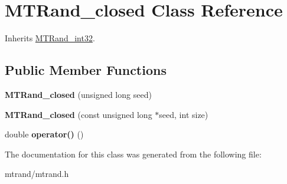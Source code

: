 \hypertarget{class_m_t_rand__closed}{
\section{\-M\-T\-Rand\-\_\-closed \-Class \-Reference}
\label{class_m_t_rand__closed}
}


\-Inherits \hyperlink{class_m_t_rand__int32}{\-M\-T\-Rand\-\_\-int32}.

\subsection*{\-Public \-Member \-Functions}
\begin{DoxyCompactItemize}
\item 
\hypertarget{class_m_t_rand__closed_ad5dc83250b16f22d4693a18b51816271}{
{\bfseries \-M\-T\-Rand\-\_\-closed} (unsigned long seed)}
\label{class_m_t_rand__closed_ad5dc83250b16f22d4693a18b51816271}

\item 
\hypertarget{class_m_t_rand__closed_a37e322f97253b7013823a267bcfe82d1}{
{\bfseries \-M\-T\-Rand\-\_\-closed} (const unsigned long $\ast$seed, int size)}
\label{class_m_t_rand__closed_a37e322f97253b7013823a267bcfe82d1}

\item 
\hypertarget{class_m_t_rand__closed_ad0c535263b63c95029523183f672f62d}{
double {\bfseries operator()} ()}
\label{class_m_t_rand__closed_ad0c535263b63c95029523183f672f62d}

\end{DoxyCompactItemize}


\-The documentation for this class was generated from the following file\-:\begin{DoxyCompactItemize}
\item 
mtrand/mtrand.\-h\end{DoxyCompactItemize}
